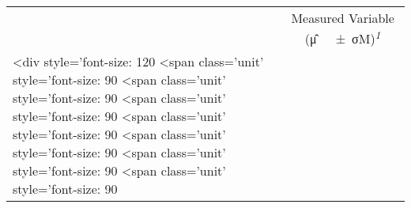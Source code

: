 \newlength\holdLTleft\newlength\holdLTright\setlength\holdLTleft{\LTleft}\relax\setlength\holdLTright{\LTright}\relax\setlength{}
\setlength{}\setlength{\LTpost}{0mm}
\begin{longtable}{@{\extracolsep{\fill}}lccccccccc}
\toprule
 & \multicolumn{9}{c}{Measured Variable (μ̂~~~±~σM)\textsuperscript{\textit{1}}} \\ 
\cmidrule(lr){2-10}
<div style='font-size: 120%
<span class='unit' style='font-size: 90%
<span class='unit' style='font-size: 90%
<span class='unit' style='font-size: 90%
<span class='unit' style='font-size: 90%
<span class='unit' style='font-size: 90%
<span class='unit' style='font-size: 90%
<span class='unit' style='font-size: 90%

\end{longtable}
